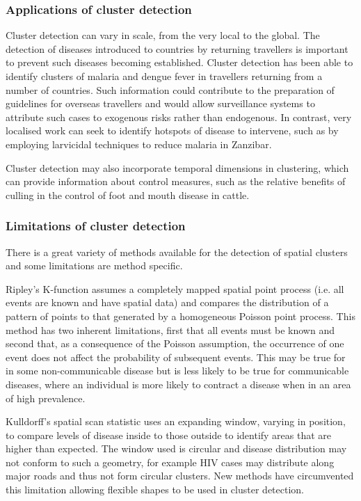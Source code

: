 \documentclass[11pt,a4paper,twoside]{article}\usepackage[]{graphicx}\usepackage[]{color}
\begin{document}
\subsubsection{Applications of cluster detection}
Cluster detection can vary in scale, from the very local to the global.
The detection of diseases introduced to countries by returning travellers is important to prevent such diseases becoming established. 
Cluster detection has been able to identify clusters of malaria and dengue fever in travellers returning from a number of countries.\cite{Leder2013}
Such information could contribute to the preparation of guidelines for overseas travellers and would allow surveillance systems to attribute such cases to exogenous risks rather than endogenous. 
In contrast, very localised work can seek to identify hotspots of disease to intervene, such as by employing larvicidal techniques to reduce malaria in Zanzibar.\cite{Bousema2012}

Cluster detection may also incorporate temporal dimensions in clustering, which can provide information about control measures, such as the relative benefits of culling in the control of foot and mouth disease in cattle. \cite{Wilesmith2003}

\subsubsection{Limitations of cluster detection}
There is a great variety of methods available for the detection of spatial clusters and some limitations are method specific. 

Ripley's K-function assumes a completely mapped spatial point process (i.e. all events are known and have spatial data) and compares the distribution of a pattern of points to that generated by a homogeneous Poisson point process. \cite{Dixon2002} 
This method has two inherent limitations, first that all events must be known and second that, as a consequence of the Poisson assumption, the occurrence of one event does not affect the probability of subsequent events.
This may be true for in some non-communicable disease but is less likely to be true for communicable diseases, where an individual is more likely to contract a disease when in an area of high prevalence. \cite{Kirkwood2003}

Kulldorff's spatial scan statistic uses an expanding window, varying in position, to compare levels of disease inside to those outside to identify areas that are higher than expected.\cite{Kulldorff1995} 
The window used is circular and disease distribution may not conform to such a geometry, for example HIV cases may distribute along major roads and thus not form circular clusters.\cite{Tatem2012} 
New methods have circumvented this limitation allowing flexible shapes to be used in cluster detection. \cite{Tango2005}
\end{document}
